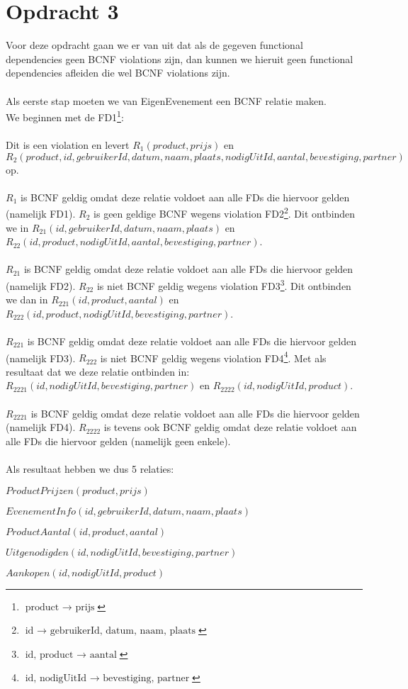 \documentclass[a4paper]{article}
\begin{document}
\newpage
\section{Opdracht 3}
Voor deze opdracht gaan we er van uit dat als de gegeven functional dependencies geen BCNF violations zijn, dan kunnen we hieruit geen functional dependencies afleiden die wel BCNF violations zijn.\\\\
Als eerste stap moeten we van EigenEvenement een BCNF relatie maken. \\
We beginnen met de FD1\footnote{$\text{product }\rightarrow\text{ prijs}$}:\\\\
Dit is een violation en levert $R_{1}(product, prijs)$ en\\ $R_{2}(product, id, gebruikerId, datum, naam, plaats, nodigUitId, aantal, bevestiging, partner)$ op.\\\\
$R_{1}$ is BCNF geldig omdat deze relatie voldoet aan alle FDs die hiervoor gelden (namelijk FD1). $R_{2}$ is geen geldige BCNF wegens violation FD2\footnote{$\text{id }\rightarrow \text{ gebruikerId, datum, naam, plaats}$}. Dit ontbinden we in $R_{21}(id, gebruikerId, datum, naam, plaats)$ en \\$R_{22}(id, product, nodigUitId, aantal, bevestiging, partner)$.\\\\
$R_{21}$ is BCNF geldig omdat deze relatie voldoet aan alle FDs die hiervoor gelden (namelijk FD2). $R_{22}$ is niet BCNF geldig wegens violation FD3\footnote{$\text{id, product }\rightarrow \text{ aantal}$}. Dit ontbinden we dan in $R_{221}(id, product, aantal)$ en $R_{222}(id, product, nodigUitId, bevestiging, partner)$.\\\\
$R_{221}$ is BCNF geldig omdat deze relatie voldoet aan alle FDs die hiervoor gelden (namelijk FD3). $R_{222}$ is niet BCNF geldig wegens violation FD4\footnote{$\text{id, nodigUitId }\rightarrow\text{  bevestiging, partner}$}. Met als resultaat dat we deze relatie ontbinden in: $R_{2221}(id, nodigUitId, bevestiging, partner)$ en $R_{2222}(id, nodigUitId, product)$.\\\\
$R_{2221}$ is BCNF geldig omdat deze relatie voldoet aan alle FDs die hiervoor gelden (namelijk FD4). $R_{2222}$ is tevens ook BCNF geldig omdat deze relatie voldoet aan alle FDs die hiervoor gelden (namelijk geen enkele).\\\\
Als resultaat hebben we dus 5 relaties:
\begin{center}
\item{$ProductPrijzen(product, prijs)$}
\item{$EvenementInfo(id, gebruikerId, datum, naam, plaats)$}
\item{$ProductAantal(id, product, aantal)$}
\item{$Uitgenodigden(id, nodigUitId, bevestiging, partner)$}
\item{$Aankopen(id, nodigUitId, product)$}
\end{center}
\newpage
\end{document}
